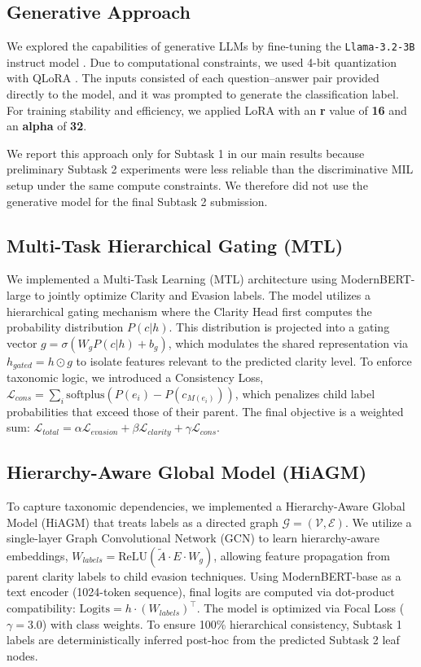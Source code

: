 \documentclass[11pt]{article}
\begin{document}
\subsection{Generative Approach}
We explored the capabilities of generative LLMs by fine-tuning the \texttt{Llama-3.2-3B} instruct model \citep{meta2024llama32}. Due to computational constraints, we used 4-bit quantization with QLoRA \citep{dettmers2023qlora}. The inputs consisted of each question--answer pair provided directly to the model, and it was prompted to generate the classification label. For training stability and efficiency, we applied LoRA \citep{hu2021lora} with an \textbf{r} value of \textbf{16} and an \textbf{alpha} of \textbf{32}.

We report this approach only for Subtask 1 in our main results because preliminary Subtask 2 experiments were less reliable than the discriminative MIL setup under the same compute constraints. We therefore did not use the generative model for the final Subtask 2 submission.

\subsection{Multi-Task Hierarchical Gating (MTL)}
We implemented a Multi-Task Learning (MTL) architecture using ModernBERT-large to jointly optimize Clarity and Evasion labels. The model utilizes a hierarchical gating mechanism where the Clarity Head first computes the probability distribution $P(c|h)$. This distribution is projected into a gating vector $g = \sigma(W_g P(c|h) + b_g)$, which modulates the shared representation via $h_{gated} = h \odot g$ to isolate features relevant to the predicted clarity level. To enforce taxonomic logic, we introduced a Consistency Loss, $\mathcal{L}_{cons} = \sum_{i} \text{softplus}(P(e_i) - P(c_{M(e_i)}))$, which penalizes child label probabilities that exceed those of their parent. The final objective is a weighted sum: $\mathcal{L}_{total} = \alpha \mathcal{L}_{evasion} + \beta \mathcal{L}_{clarity} + \gamma \mathcal{L}_{cons}$.

\subsection{Hierarchy-Aware Global Model (HiAGM)}
To capture taxonomic dependencies, we implemented a Hierarchy-Aware Global Model (HiAGM) \citep{zhou2020hierarchy} that treats labels as a directed graph $\mathcal{G} = (\mathcal{V}, \mathcal{E})$. We utilize a single-layer Graph Convolutional Network (GCN) to learn hierarchy-aware embeddings, $W_{labels} = \text{ReLU}(\tilde{A} \cdot E \cdot W_g)$, allowing feature propagation from parent clarity labels to child evasion techniques. Using ModernBERT-base as a text encoder (1024-token sequence), final logits are computed via dot-product compatibility: $\text{Logits} = h \cdot (W_{labels})^\top$. The model is optimized via Focal Loss ($\gamma=3.0$) with class weights. To ensure 100\% hierarchical consistency, Subtask 1 labels are deterministically inferred post-hoc from the predicted Subtask 2 leaf nodes.
\end{document}
